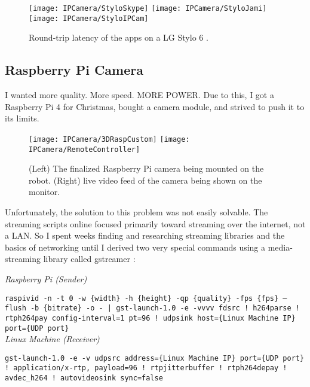 \begin{figure}[!htb]
    \centering
    \texttt{[image: IPCamera/StyloSkype]}
    \texttt{[image: IPCamera/StyloJami]}
    \texttt{[image: IPCamera/StyloIPCam]}
    \caption{
        Round-trip latency of the apps on a LG Stylo 6 \cite{Stylo}.
    }
\end{figure}

\newpage
\subsection{Raspberry Pi Camera}
I wanted more quality. More speed. MORE POWER. Due to this, I got a Raspberry Pi 4 for Christmas, bought a camera module, and strived to push it to its limits.

\begin{figure}[!htb]
    \centering
    \texttt{[image: IPCamera/3DRaspCustom]}
    \texttt{[image: IPCamera/RemoteController]}
    \caption{
        (Left) The finalized Raspberry Pi camera being mounted on the robot. (Right) live video feed of the camera being shown on the monitor.
    }
\end{figure}

Unfortunately, the solution to this problem was not easily solvable. The streaming scripts online focused primarily toward streaming over the internet, not a LAN. So I spent weeks finding and researching streaming libraries and the basics of networking until I derived two very special commands using a media-streaming library called gstreamer \cite{gstreamer}:

\begin{centering}

\textit{Raspberry Pi (Sender)}

\texttt{raspivid -n -t 0 -w \{width\} -h \{height\} -qp \{quality\} -fps \{fps\} --flush -b \{bitrate\} -o - | gst-launch-1.0 -e -vvvv fdsrc ! h264parse ! rtph264pay config-interval=1 pt=96 ! udpsink host=\{Linux Machine IP\} port=\{UDP port\}} \\[1cm]

\textit{Linux Machine (Receiver)}

\texttt{gst-launch-1.0 -e -v udpsrc address=\{Linux Machine IP\} port=\{UDP port\} ! application/x-rtp, payload=96 ! rtpjitterbuffer ! rtph264depay ! avdec\_h264 ! autovideosink sync=false}

\end{centering}

